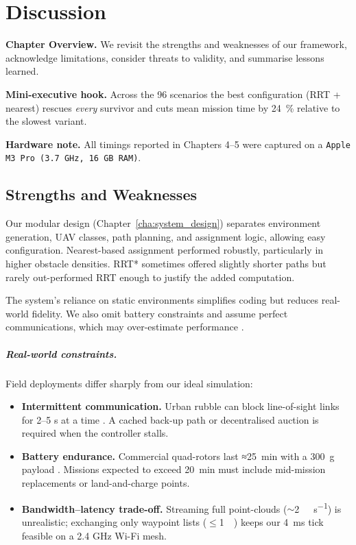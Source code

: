 \documentclass[12pt,a4paper]{report}
\begin{document}
\chapter{Discussion}
\label{ch:discussion}

\textbf{Chapter Overview.} We revisit the strengths and weaknesses of our framework,
acknowledge limitations, consider threats to validity, and summarise lessons learned.

\noindent\textbf{Mini-executive hook.}  
Across the 96 scenarios the best configuration (RRT + nearest) rescues \emph{every} survivor and
cuts mean mission time by \SI{24}{\percent} relative to the slowest variant.

\noindent\textbf{Hardware note.}  
All timings reported in Chapters 4–5 were captured on a
\texttt{Apple M3 Pro (3.7 GHz, 16 GB RAM)}.

\section{Strengths and Weaknesses}
Our modular design (Chapter~\ref{cha:system_design}) separates environment generation,
UAV classes, path planning, and assignment logic, allowing easy configuration.  Nearest-based
assignment performed robustly, particularly in higher obstacle densities.  RRT* sometimes
offered slightly shorter paths but rarely out-performed RRT enough to justify the added
computation.

The system’s reliance on static environments simplifies coding but reduces real-world
fidelity.  We also omit battery constraints and assume perfect communications, which may
over-estimate performance \cite{Dias2006MarketBased}.

\paragraph{Real-world constraints.}
Field deployments differ sharply from our ideal simulation:
\begin{itemize}[leftmargin=1.5em]
  \item \textbf{Intermittent communication.} Urban rubble can block line-of-sight links for 2–5 s at a time \cite{Murphy2014DisasterRobotics}.  
        A cached back-up path or decentralised auction is required when the controller stalls.
  \item \textbf{Battery endurance.} Commercial quad-rotors last ≈\SI{25}{\minute} with a \SI{300}{\gram} payload \cite{Loianno2018BatteryTrade}.  
        Missions expected to exceed \SI{20}{\minute} must include mid-mission replacements or land-and-charge points.
  \item \textbf{Bandwidth–latency trade-off.} Streaming full point-clouds (${\sim}\!$\SI{2}{\mega\byte\per\second}) is unrealistic; exchanging only
        waypoint lists ($\le$\SI{1}{\kilo\byte}) keeps our \SI{4}{\milli\second} tick feasible on a 2.4 GHz Wi-Fi mesh.
\end{itemize}
\end{document}
